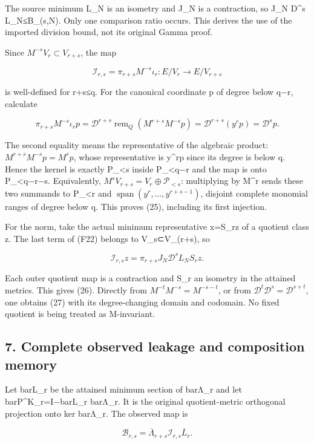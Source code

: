\documentclass[11pt]{article}
\begin{document}
The source minimum L\_N is an isometry and J\_N is a contraction, so \textbar\textbar J\_N D\^{}s L\_N\textbar\textbar≤B\_(s,N). Only one comparison ratio occurs. This derives the use of the imported division bound, not its original Gamma proof.

Since \(M^{-s}V_r\subset V_{r+s}\), the map

\[
\mathcal I_{r,s}=\pi_{r+s}M^{-s}\iota_r:E/V_r\to E/V_{r+s}
\]

is well-defined for r+s≤q. For the canonical coordinate p of degree below q−r, calculate

\[
\pi_{r+s}M^{-s}\iota_rp
=\mathscr D^{r+s}\operatorname{rem}_Q(M^{r+s}M^{-s}p)
=\mathscr D^{r+s}(y^rp)=\mathscr D^sp. \tag{F24}
\]

The second equality means the representative of the algebraic product: \(M^{r+s}M^{-s}p=M^rp\), whose representative is y\^{}rp since its degree is below q. Hence the kernel is exactly P\_\textless s inside P\_\textless q−r and the map is onto P\_\textless q−r−s. Equivalently, \(M^sV_{r+s}=V_r\oplus\mathcal P_{<s}\): multiplying by M\^{}r sends these two summands to P\_\textless r and \(\operatorname{span}(y^r,\ldots,y^{r+s-1})\), disjoint complete monomial ranges of degree below q. This proves (25), including its first injection.

For the norm, take the actual minimum representative x=S\_rz of a quotient class z. The last term of (F22) belongs to V\_s⊂V\_(r+s), so

\[
\mathcal I_{r,s}z=\pi_{r+s}J_N\mathscr D^sL_NS_rz.
\]

Each outer quotient map is a contraction and S\_r an isometry in the attained metrics. This gives (26). Directly from \(M^{-t}M^{-s}=M^{-s-t}\), or from \(\mathscr D^t\mathscr D^s=\mathscr D^{s+t}\), one obtains (27) with its degree-changing domain and codomain. No fixed quotient is being treated as M-invariant.

\subsection{7. Complete observed leakage and composition memory}\label{complete-observed-leakage-and-composition-memory}

Let barL\_r be the attained minimum section of barΛ\_r and let barP\^{}K\_r=I−barL\_r barΛ\_r. It is the original quotient-metric orthogonal projection onto ker barΛ\_r. The observed map is

\[
\mathcal B_{r,s}=\overline\Lambda_{r+s}
\mathcal I_{r,s}\overline L_r.
\]
\end{document}

